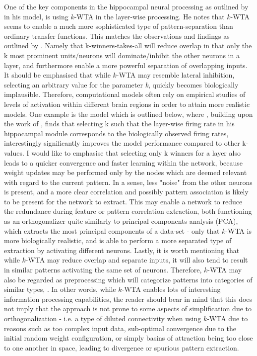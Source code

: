 One of the key components in the hippocampal neural processing as outlined by \cite{Hattori2014} in his model, is using $k$-WTA in the layer-wise processing. He notes that $k$-WTA seems to enable a much more sophisticated type of pattern-separation than ordinary transfer functions. This matches the observations and findings as outlined by \cite{Rolls1998chpt4, Rolls1998chpt6}. Namely that k-winners-takes-all will reduce overlap in that only the k most prominent units/neurons will dominate/inhibit the other neurons in a layer, and furthermore enable a more powerful separation of overlapping inputs. It should be emphasised that while $k$-WTA may resemble lateral inhibition, selecting an arbitrary value for the parameter \textit{k}, quickly becomes biologically implausible. Therefore, computational models often rely on empirical studies of levels of activation within different brain regions in order to attain more realistic models. One example is the model which is outlined below, where \cite{Hattori2014}, building upon the work of \cite{Wakagi2008}, finds that selecting k such that the layer-wise firing rate in his hippocampal module corresponds to the biologically observed firing rates, interestingly significantly improves the model performance compared to other k-values. I would like to emphasise that selecting only k winners for a layer also leads to a quicker convergence and faster learning within the network, because weight updates may be performed only by the nodes which are deemed relevant with regard to the current pattern. In a sense, less "noise" from the other neurons is present, and a more clear correlation and possibly pattern association is likely to be present for the network to extract. This may enable a network to reduce the redundance during feature or pattern correlation extraction, both functioning as an orthogonalizer quite similarly to principal components analysis (PCA), which extracts the most principal components of a data-set - only that $k$-WTA is more biologically realistic, and is able to perform a more separated type of extraction by activating different neurons.
Lastly, it is worth mentioning that while $k$-WTA may reduce overlap and separate inputs, it will also tend to result in similar patterns activating the same set of neurons. Therefore, $k$-WTA may also be regarded as preprocessing which will categorize patterns into categories of similar types, \citep{Rolls1998chpt1}. In other words, while $k$-WTA enables lots of interesting information processing capabilities, the reader should bear in mind that this does not imply that the approach is not prone to some aspects of simplification due to orthogonalization - i.e. a type of diluted connectivity when using $k$-WTA due to reasons such as too complex input data, sub-optimal convergence due to the initial random weight configuration, or simply basins of attraction being too close to one another in space, leading to divergence or spurious pattern extraction.


